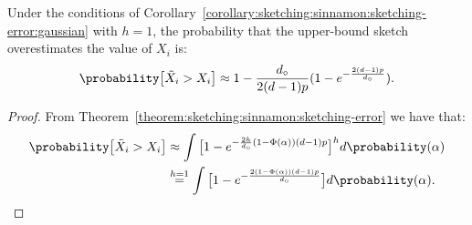 \begin{lemma}
    Under the conditions of Corollary~\ref{corollary:sketching:sinnamon:sketching-error:gaussian}
    with $h=1$, the probability that the upper-bound sketch overestimates the
    value of $X_i$ is:
    \begin{equation*}
        \probability\big[ \tilde{X}_i > X_i \big] \approx 1 - \frac{d_\circ}{2(d - 1)p} (1 - e^{-\frac{2(d - 1)p}{d_\circ}} ).
    \end{equation*}
\end{lemma}
\begin{proof}
    From Theorem~\ref{theorem:sketching:sinnamon:sketching-error} we have that:
    \begin{align*}
        \probability\big[ \tilde{X}_i > X_i \big] &\approx 
        \int {\big[ 1 - e^{-\frac{2h}{d_\circ} (1 - \Phi(\alpha)) (d - 1)p} \big]^h d\probability(\alpha)} \\
        &\overset{h=1}{=} \int {\big[ 1 - e^{-\frac{2 (1 - \Phi(\alpha)) (d - 1) p}{d_\circ}} \big] d\probability(\alpha)}.
    \end{align*}


\end{proof}
